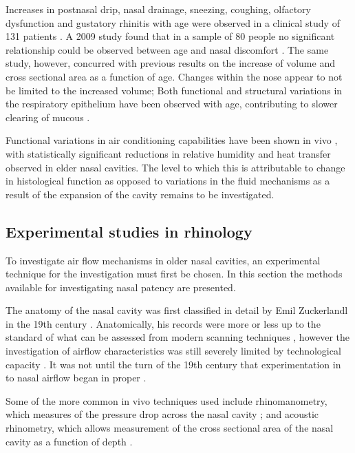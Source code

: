 Increases in postnasal drip, nasal drainage, sneezing, coughing, olfactory dysfunction and gustatory rhinitis with age were observed in a clinical study of 131 patients \cite{Edelstein1996}. A 2009 study found that in a sample of 80 people no significant relationship could be observed between age and nasal discomfort \cite{Lindemann2010}. The same study, however, concurred with previous results on the increase of volume and cross sectional area as a function of age. Changes within the nose appear to not be limited to the increased volume; Both functional and structural variations in the respiratory epithelium have been observed with age, contributing to slower clearing of mucous \cite{HO2001}. 

Functional variations in air conditioning capabilities have been shown in vivo \cite{Lindemann2008}, with statistically significant reductions in relative humidity and heat transfer observed in elder nasal cavities. The level to which this is attributable to change in histological function as opposed to variations in the fluid mechanisms as a result of the expansion of the cavity remains to be investigated.

 \subsection{Experimental studies in rhinology}
 
To investigate air flow mechanisms in older nasal cavities, an experimental technique for the investigation must first be chosen. In this section the methods available for investigating nasal patency are presented.

The anatomy of the nasal cavity was first classified in detail by Emil Zuckerlandl in the 19th century \cite{Stammberger1989}. Anatomically, his records were more or less up to the standard of what can be assessed from modern scanning techniques \cite{Stammberger1989}, however the investigation of airflow characteristics was still severely limited by technological capacity \cite{Eccles2000}. It was not until the turn of the 19th century that experimentation in to nasal airflow began in proper \cite{Eccles2000}. 

Some of the more common in vivo techniques used include rhinomanometry, which measures of the pressure drop across the nasal cavity \cite{Hilberg1989}; and acoustic rhinometry, which allows measurement of the cross sectional area of the nasal cavity as a function of depth \cite{Hilberg1989}. 

